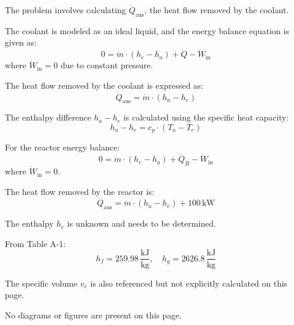 The problem involves calculating \( \dot{Q}_{\text{aus}} \), the heat flow removed by the coolant.  

The coolant is modeled as an ideal liquid, and the energy balance equation is given as:  
\[
0 = \dot{m} \cdot (h_e - h_a) + \dot{Q} - \dot{W}_{\text{in}}
\]  
where \( \dot{W}_{\text{in}} = 0 \) due to constant pressure.  

The heat flow removed by the coolant is expressed as:  
\[
\dot{Q}_{\text{aus}} = \dot{m} \cdot (h_a - h_e)
\]  

The enthalpy difference \( h_a - h_e \) is calculated using the specific heat capacity:  
\[
h_a - h_e = c_p \cdot (T_a - T_e)
\]  

For the reactor energy balance:  
\[
0 = \dot{m} \cdot (h_e - h_a) + \dot{Q}_R - \dot{W}_{\text{in}}
\]  
where \( \dot{W}_{\text{in}} = 0 \).  

The heat flow removed by the reactor is:  
\[
\dot{Q}_{\text{aus}} = \dot{m} \cdot (h_a - h_e) + 100 \, \text{kW}
\]  

The enthalpy \( h_e \) is unknown and needs to be determined.  

From Table A-1:  
\[
h_f = 259.98 \, \frac{\text{kJ}}{\text{kg}}, \quad h_g = 2626.8 \, \frac{\text{kJ}}{\text{kg}}
\]  

The specific volume \( v_e \) is also referenced but not explicitly calculated on this page.  

No diagrams or figures are present on this page.
